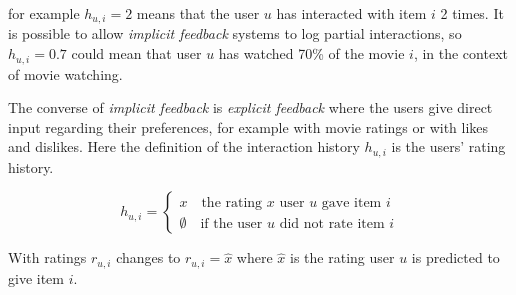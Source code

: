 for example $h_{u, i} = 2$ means that the user $u$ has interacted with item $i$ 2 times. It is possible to allow \textit{implicit feedback} systems to log partial interactions, so $h_{u, i} = 0.7$ could mean that user $u$ has watched 70\% of the movie $i$, in the context of movie watching. \citep{hu2008collaborative}

The converse of \textit{implicit feedback} is \textit{explicit feedback} where the users give direct input regarding their preferences, for example with movie ratings or with likes and dislikes.  Here the definition of the interaction history $h_{u, i}$ is the users' rating history.

\begin{equation}
    h_{u, i} = \begin{cases}
        x \quad \text{the rating $x$ user $u$ gave item $i$} \\
        \emptyset \quad \text{if the user $u$ did not rate item $i$}
    \end{cases}
\end{equation}


With ratings $r_{u, i}$ changes to $r_{u, i} = \hat{x}$ where $\hat{x}$ is the rating user $u$ is predicted to give item $i$.
